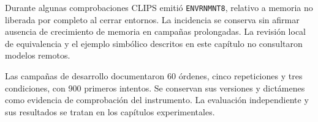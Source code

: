 Durante algunas comprobaciones CLIPS emitió \texttt{ENVRNMNT8},
relativo a memoria no liberada por completo al cerrar entornos. La
incidencia se conserva sin afirmar ausencia de crecimiento de memoria
en campañas prolongadas. La revisión local de equivalencia y el ejemplo
simbólico descritos en este capítulo no consultaron modelos remotos.

Las campañas de desarrollo documentaron 60 órdenes, cinco repeticiones y tres
condiciones, con 900 primeros intentos. Se conservan sus versiones y dictámenes
como evidencia de comprobación del instrumento. La evaluación independiente
y sus resultados se tratan en los capítulos experimentales.
